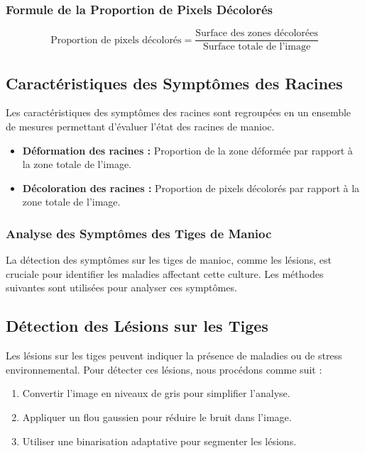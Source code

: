 \subsubsection*{Formule de la Proportion de Pixels Décolorés}
\[
\text{Proportion de pixels décolorés} = \frac{\text{Surface des zones décolorées}}{\text{Surface totale de l'image}}
\]

\subsection*{Caractéristiques des Symptômes des Racines}

Les caractéristiques des symptômes des racines sont regroupées en un ensemble de mesures permettant d'évaluer l'état des racines de manioc.

\begin{itemize}
	\item \textbf{Déformation des racines :} Proportion de la zone déformée par rapport à la zone totale de l'image.
	\item \textbf{Décoloration des racines :} Proportion de pixels décolorés par rapport à la zone totale de l'image.
\end{itemize}

\subsubsection{Analyse des Symptômes des Tiges de Manioc}

La détection des symptômes sur les tiges de manioc, comme les lésions, est cruciale pour identifier les maladies affectant cette culture. Les méthodes suivantes sont utilisées pour analyser ces symptômes.

\subsection*{Détection des Lésions sur les Tiges}

Les lésions sur les tiges peuvent indiquer la présence de maladies ou de stress environnemental. Pour détecter ces lésions, nous procédons comme suit :
\begin{enumerate}
	\item Convertir l'image en niveaux de gris pour simplifier l'analyse.
	\item Appliquer un flou gaussien pour réduire le bruit dans l'image.
	\item Utiliser une binarisation adaptative pour segmenter les lésions.
\end{enumerate}

